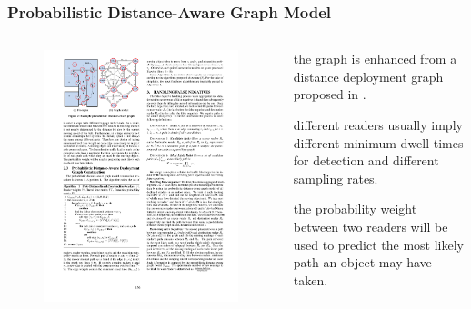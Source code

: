 \begin{frame}
\frametitle{Probabilistic Distance-Aware Graph Model}

\begin{columns}

  \begin{figure}[tb]
    \includegraphics[width=\columnwidth]{figures/3-3/3-3-2.pdf}
  \end{figure}

  \begin{fitemize}
    \item the graph is enhanced from a distance deployment graph proposed in \cite{baba2013spatiotemporal}.
    \item different readers usually imply different minimum dwell times for detection and different sampling rates.
    \item the probability weight between two readers will be used to predict the most likely path an object may have taken.
  \end{fitemize}

\end{columns}

\end{frame}


